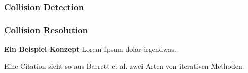 \documentclass[a4paper,12pt]{llncs}
\numberwithin{equation}{section}
\begin{document}
\subsubsection{Collision Detection}

\subsubsection{Collision Resolution}

\begin{definition}
  \textbf{Ein Beispiel Konzept} Lorem Ipsum dolor irgendwas.
\end{definition}
Eine Citation sieht so aus Barrett et al. \cite{templates} zwei Arten von iterativen Methoden.
\end{document}
